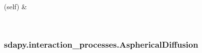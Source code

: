 \documentclass[letterpaper,10pt,english]{sphinxmanual}
\begin{document}
\begin{fulllineitems}
\begin{savenotes}
\begin{longtable}[c]{}
\begin{quote}
\begin{description}
\end{description}\end{quote}

\\
\hline
{}(self)
&

\\
\hline
\end{longtable}\sphinxatlongtableend\end{savenotes}

\end{fulllineitems}



\subsubsection{sdapy.interaction\_processes.AsphericalDiffusion}
\label{\detokenize{generated/sdapy.interaction_processes.AsphericalDiffusion:sdapy-interaction-processes-asphericaldiffusion}}\label{\detokenize{generated/sdapy.interaction_processes.AsphericalDiffusion::doc}}
\end{document}
